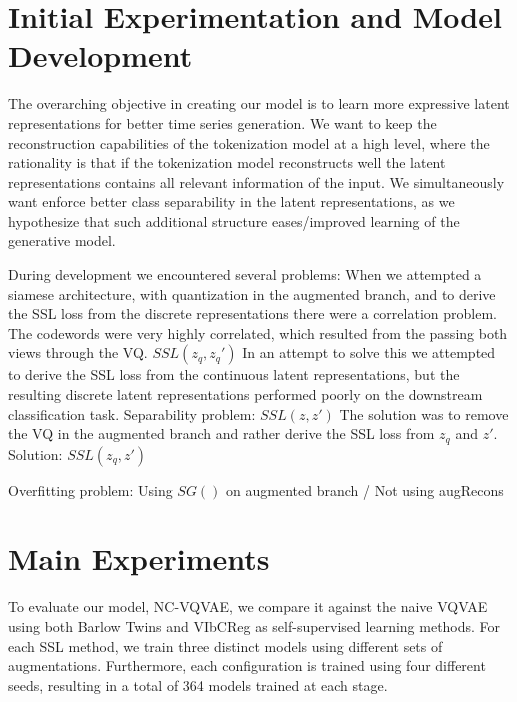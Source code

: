 \documentclass[../../thesis.tex]{subfiles}
\begin{document}
\section{Initial Experimentation and Model Development}

The overarching objective in creating our model is to learn more expressive latent representations for better time series generation. We want to keep the reconstruction capabilities of the tokenization model at a high level, where the rationality is that if the tokenization model reconstructs well the latent representations contains all relevant information of the input. We simultaneously want enforce better class separability in the latent representations, as we hypothesize that such additional structure eases/improved learning of the generative model.\newline

During development we encountered several problems:\newline
When we attempted a siamese architecture, with quantization in the augmented branch, and to derive the SSL loss from the discrete representations there were a correlation problem. The codewords were very highly correlated, which resulted from the passing both views through the VQ.  $SSL(z_q,z_q')$ \newline
In an attempt to solve this we attempted to derive the SSL loss from the continuous latent representations, but the resulting discrete latent representations performed poorly on the downstream classification task. Separability problem: $SSL(z,z')$ \newline
The solution was to remove the VQ in the augmented branch and rather derive the SSL loss from $z_q$ and $z'$. Solution: $SSL(z_q,z')$ \newline

Overfitting problem: Using $SG()$ on augmented branch / Not using augRecons \newline

\section{Main Experiments}

To evaluate our model, NC-VQVAE, we compare it against the naive VQVAE using both Barlow Twins and VIbCReg as self-supervised learning methods. For each SSL method, we train three distinct models using different sets of augmentations. Furthermore, each configuration is trained using four different seeds, resulting in a total of 364 models trained at each stage.
\end{document}
